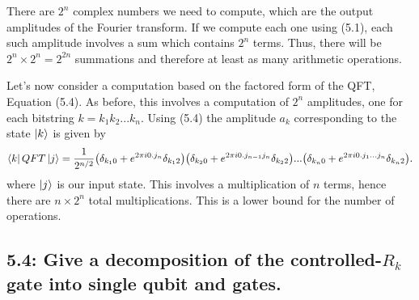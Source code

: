 \documentclass{article}
\begin{document}
There are $2^n$ complex numbers we need to compute, which are the output amplitudes of the Fourier transform. If we compute each one using (5.1), each such amplitude involves a sum which contains $2^n$ terms. Thus, there will be $2^n \times 2^n = 2^{2n}$ summations and therefore at least as many arithmetic operations.

Let's now consider a computation based on the factored form of the QFT, Equation (5.4). As before, this involves a computation of $2^n$ amplitudes, one for each bitstring $k = k_1k_2...k_n$. Using (5.4) the amplitude $a_{k}$ corresponding to the state $\ket{k}$ is given by
\begin{align}
    \bra{k}QFT\ket{j} = \frac{1}{2^{n/2}}\big(\delta_{k_1 0}+e^{2\pi i0.j_n}\delta_{k_1 2}\big)\big(\delta_{k_2 0}+e^{2\pi i0.j_{n-1}j_n}\delta_{k_2 2}\big)...\big(\delta_{k_n 0}+e^{2\pi i0.j_1...j_n}\delta_{k_n 2}\big).
\end{align}
where $\ket{j}$ is our input state. This involves a multiplication of $n$ terms, hence there are $n\times 2^n$ total multiplications. This is a lower bound for the number of operations. 

\subsection{5.4: Give a decomposition of the controlled-$R_k$ gate into single qubit and  gates.}
\end{document}
